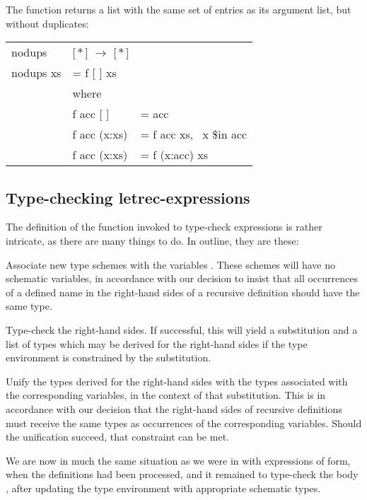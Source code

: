 The function  returns a list with the same set of entries as its
argument list, but without duplicates:

\begin{mlcoded}
    \begin{tabular}{l@{\hspace{6pt}}l@{\hspace{6pt}}l}
        nodups \hastype{}&[\,$\ast$\,] $\rightarrow$ [\,$\ast$\,] &\\
        nodups xs &= f [ ] xs &\\
        &where &\\
        &\hspace{0.5cm}f acc [ ] &= acc \\
        &\hspace{0.5cm}f acc (x:xs) &= f acc xs, \ x \$in acc \\
        &\hspace{0.5cm}f acc (x:xs) &= f (x:acc) xs
    \end{tabular}
\end{mlcoded}

\subsection{Type-checking letrec-expressions}

The definition of the function invoked to type-check expressions
 is rather intricate, as there are many things to do. In
outline, they are these:

\begin{numbered}
    \item Associate new type schemes with the variables . These schemes will
    have no schematic variables, in accordance with our decision to insist
    that all occurrences of a defined name in the right-hand sides of a
    recursive definition should have the same type.
    \item Type-check the right-hand sides. If successful, this will yield a
    substitution and a list of types which may be derived for the right-hand
    sides if the type environment is constrained by the substitution.
    \item Unify the types derived for the right-hand sides with the types associated
    with the corresponding variables, in the context of that substitution. This
    is in accordance with our decision that the right-hand sides of recursive
    definitions must receive the same types as occurrences of the corresponding variables. Should the unification succeed, that constraint can be
    met.
    \item We are now in much the same situation as we were in with expressions of
     form, when the definitions had been processed, and it remained to
    type-check the body , after updating the type environment with
    appropriate schematic types.
\end{numbered}

